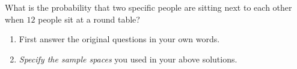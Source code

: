 \begin{exercise}[\textbf{BH.38}]
What is the probability that two specific people are sitting next to each other when $12$ people sit at a round table? 
	\begin{enumerate}
		\item First answer the original questions in your own words.
		\item  \textit{Specify the sample spaces} you used in your above solutions. 
	\end{enumerate}
\end{exercise}
